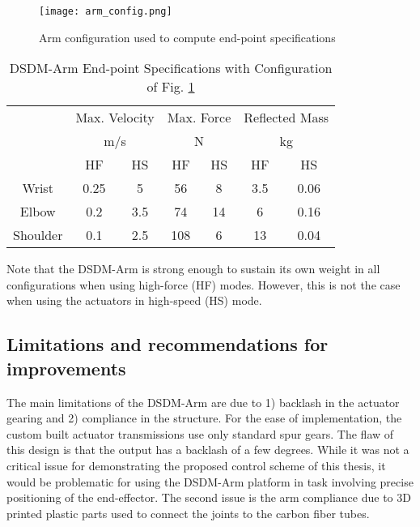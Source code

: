 \begin{figure}[htb]
	\centering
		\texttt{[image: arm\_config.png]}
	\caption{Arm configuration used to compute end-point specifications}
	\label{fig:arm_config}
\end{figure}

\begin{table}[htpb]
	\centering
	\caption[DSDM-Arm End-point Specifications]{DSDM-Arm End-point Specifications with Configuration of Fig. \ref{fig:arm_config}}
		\begin{tabular}{ c c c c c c c }
			\hline
			   & \multicolumn{2}{c}{Max. Velocity} & \multicolumn{2}{c}{Max. Force} & \multicolumn{2}{c}{Reflected Mass}\\
			   & \multicolumn{2}{c}{m/s} & \multicolumn{2}{c}{N} & \multicolumn{2}{c}{kg } \\
				\hline
			  & HF & HS & HF & HS & HF & HS \\
			\hline
			 Wrist    & 0.25 & 5    & 56  &  8  & 3.5 & 0.06   \\
			 Elbow    & 0.2  & 3.5  & 74  &  14 & 6   & 0.16    \\
			 Shoulder & 0.1  & 2.5  & 108 &  6  & 13  & 0.04    \\
			\hline
		\end{tabular}
	\label{tab:robotspec2}
\end{table}

Note that the DSDM-Arm is strong enough to sustain its own weight in all configurations when using high-force (HF) modes. However, this is not the case when using the actuators in high-speed (HS) mode. 


\subsection{Limitations and recommendations for improvements} 

The main limitations of the DSDM-Arm are due to 1) backlash in the actuator gearing and 2) compliance in the structure. For the ease of implementation, the custom built actuator transmissions use only standard spur gears. The flaw of this design is that the output has a backlash of a few degrees. While it was not a critical issue for demonstrating the proposed control scheme of this thesis, it would be problematic for using the DSDM-Arm platform in task involving precise positioning of the end-effector. The second issue is the arm compliance due to 3D printed plastic parts used to connect the joints to the carbon fiber tubes. 

